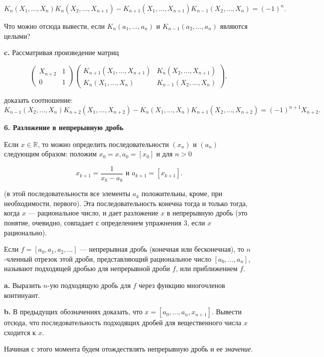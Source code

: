 \documentclass{mai_book}
\begin{document}
\[
K_n(X_1,...,X_n)K_n(X_2,...,X_{n+1})-K_{n+1}(X_1,...,X_{n+1})K_{n-1}(X_2,...,X_n) = (-1)^n.
\]

\noindent Что можно отсюда вывести, если $K_n(a_1,...,a_n)$ и $K_{n-1}(a_2,...,a_n)$ являются целыми?

\textbf{c.} Рассматривая произведение матриц

\[
\begin{pmatrix}
X_{n+2} & 1\\
0 & 1
\end{pmatrix} \begin{pmatrix}
K_{n+1}(X_1,...,X_{n+1}) & K_n(X_2,...,X_{n+1})\\
K_n(X_1,...,X_n) & K_{n-1}(X_2,...,X_n)
\end{pmatrix},
\]

\noindent доказать соотношение:
\[
K_{n-1}(X_2,...,X_n)K_{n+2}(X_1,...,X_{n+2})-K_n(X_1,...,X_n)K_{n+1}(X_2,...,X_{n+2}) = (-1)^{n+1}X_{n+2}.
\]

\pagebreak


\noindent \textbf{6. Разложение в непрерывную дробь}

Если $x \in \mathbb{R}$, то можно определить последовательности $(x_n)$ и $(a_n)$ следующим образом: положим $x_0 = x, a_0 = [x_0]$ и для $n>0$

\[
x_{k+1} = \frac{1}{x_k-a_k} \text{ и } a_{k+1} = [x_{k+1}].
\]

\noindent (в этой последовательности все элементы $a_k$ положительны, кроме,
при необходимости, первого). Эта последовательность конечна тогда
и только тогда, когда $x$ — рациональное число, и дает разложение $x$ в
непрерывную дробь (это понятие, очевидно, совпадает с определением
упражнения 3, если $x$ рационально).

Если $f = [a_0,a_1,a_2,...]$ — непрерывная дробь (конечная или 
бесконечная), то $n$-членный отрезок этой дроби, представляющий 
рациональное число $[a_0,...,a_n]$, называют подходящей дробью для непрерывной дроби $f$, или приближением $f$.

\textbf{a.} Выразить $n$-ую подходящую дробь для $f$ через функцию 
многочленов континуант.

\textbf{b.} В предыдущих обозначениях доказать, что $x = [a_0,...,a_n,x_{n+1}]$. Вывести отсюда, что последовательность подходящих дробей для 
вещественного числа $x$ сходится к $x$.

Начиная с этого момента будем отождествлять непрерывную дробь
и ее \textit{значение}.
\end{document}
